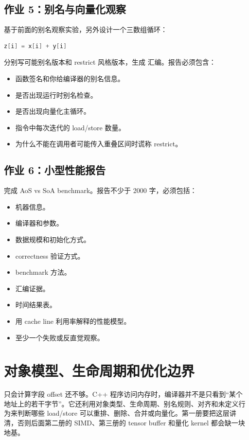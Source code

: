 \begin{exercisebox}
\subsection*{作业 5：别名与向量化观察}

基于前面的别名观察实验，另外设计一个三数组循环：

\begin{lstlisting}[language=C++]
z[i] = x[i] + y[i]
\end{lstlisting}

分别写可能别名版本和 restrict 风格版本，生成  汇编。报告必须包含：

\begin{itemize}
  \item 函数签名和你给编译器的别名信息。
  \item 是否出现运行时别名检查。
  \item 是否出现向量化主循环。
  \item 指令中每次迭代的 load/store 数量。
  \item 为什么不能在调用者可能传入重叠区间时谎称 restrict。
\end{itemize}

\subsection*{作业 6：小型性能报告}

完成 AoS vs SoA benchmark。报告不少于 2000 字，必须包括：

\begin{itemize}
  \item 机器信息。
  \item 编译器和参数。
  \item 数据规模和初始化方式。
  \item correctness 验证方式。
  \item benchmark 方法。
  \item 汇编证据。
  \item 时间结果表。
  \item 用 cache line 利用率解释的性能模型。
  \item 至少一个失败或反直觉观察。
\end{itemize}
\end{exercisebox}

\section{对象模型、生命周期和优化边界}

只会计算字段 offset 还不够。C++ 程序访问内存时，编译器并不是只看到“某个地址上的若干字节”。它还利用对象类型、生命周期、别名规则、对齐和未定义行为来判断哪些 load/store 可以重排、删除、合并或向量化。第一册要把这层讲清，否则后面第二册的 SIMD、第三册的 tensor buffer 和量化 kernel 都会缺一块地基。

